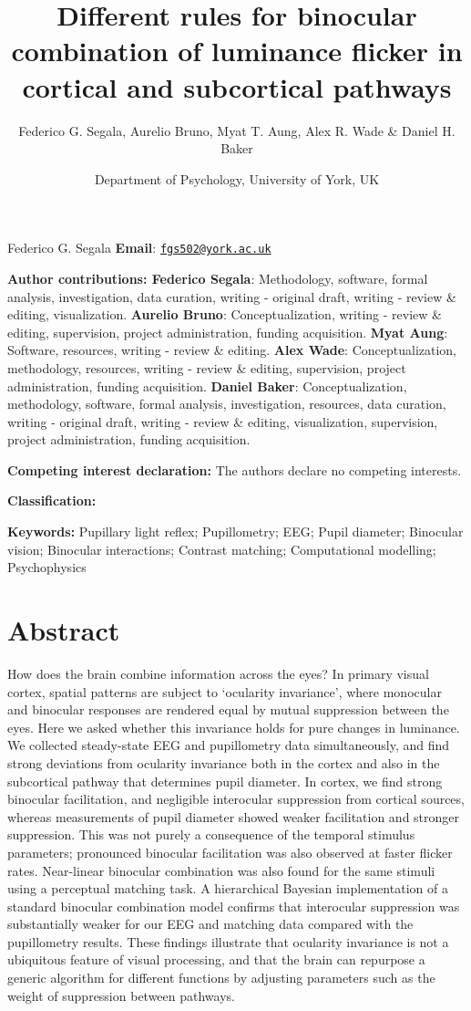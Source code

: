 \documentclass[
]{article}
\title{Different rules for binocular combination of luminance flicker in cortical and subcortical pathways}
\author{Federico G. Segala, Aurelio Bruno, Myat T. Aung, Alex R. Wade \& Daniel H. Baker}
\date{Department of Psychology, University of York, UK}
\begin{document}
\maketitle

Federico G. Segala
\textbf{Email}: \href{mailto:fgs502@york.ac.uk}{\nolinkurl{fgs502@york.ac.uk}}

\textbf{Author contributions: Federico Segala}: Methodology, software, formal analysis, investigation, data curation, writing - original draft, writing - review \& editing, visualization. \textbf{Aurelio Bruno}: Conceptualization, writing - review \& editing, supervision, project administration, funding acquisition. \textbf{Myat Aung}: Software, resources, writing - review \& editing. \textbf{Alex Wade}: Conceptualization, methodology, resources, writing - review \& editing, supervision, project administration, funding acquisition. \textbf{Daniel Baker}: Conceptualization, methodology, software, formal analysis, investigation, resources, data curation, writing - original draft, writing - review \& editing, visualization, supervision, project administration, funding acquisition.

\textbf{Competing interest declaration:} The authors declare no competing interests.

\textbf{Classification:}

\textbf{Keywords:} Pupillary light reflex; Pupillometry; EEG; Pupil diameter; Binocular vision; Binocular interactions; Contrast matching; Computational modelling; Psychophysics

\hypertarget{abstract}{%
\section{Abstract}\label{abstract}}

How does the brain combine information across the eyes? In primary visual cortex, spatial patterns are subject to `ocularity invariance', where monocular and binocular responses are rendered equal by mutual suppression between the eyes. Here we asked whether this invariance holds for pure changes in luminance. We collected steady-state EEG and pupillometry data simultaneously, and find strong deviations from ocularity invariance both in the cortex and also in the subcortical pathway that determines pupil diameter. In cortex, we find strong binocular facilitation, and negligible interocular suppression from cortical sources, whereas measurements of pupil diameter showed weaker facilitation and stronger suppression. This was not purely a consequence of the temporal stimulus parameters; pronounced binocular facilitation was also observed at faster flicker rates. Near-linear binocular combination was also found for the same stimuli using a perceptual matching task. A hierarchical Bayesian implementation of a standard binocular combination model confirms that interocular suppression was substantially weaker for our EEG and matching data compared with the pupillometry results. These findings illustrate that ocularity invariance is not a ubiquitous feature of visual processing, and that the brain can repurpose a generic algorithm for different functions by adjusting parameters such as the weight of suppression between pathways.
\end{document}
